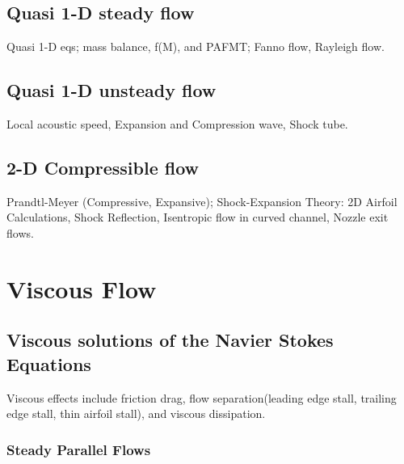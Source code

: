 \documentclass[oneside,a4paper,11pt]{report}
\begin{document}
\chapter{Quasi 1-D steady flow}
Quasi 1-D eqs; mass balance, f(M), and PAFMT; Fanno flow, Rayleigh flow.

\chapter{Quasi 1-D unsteady flow}
Local acoustic speed, Expansion and Compression wave, Shock tube.

\chapter{2-D Compressible flow}
Prandtl-Meyer (Compressive, Expansive); Shock-Expansion Theory: 2D Airfoil Calculations, Shock Reflection, Isentropic flow in curved channel, Nozzle exit flows.

\part{Viscous Flow}

\chapter{Viscous solutions of the Navier Stokes Equations}
Viscous effects include friction drag, flow separation(leading edge stall, trailing edge stall, thin airfoil stall), and viscous dissipation.

\section{Steady Parallel Flows}
\end{document}
